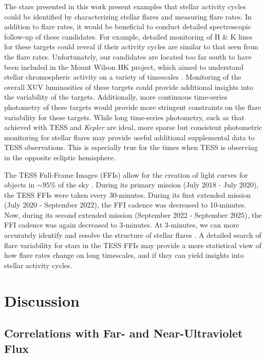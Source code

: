 \documentclass[twocolumn]{aastex631}
\begin{document}
The stars presented in this work present examples that stellar activity cycles could be identified by characterizing stellar flares and measuring flare rates. In addition to flare rates, it would
be beneficial to conduct detailed spectroscopic follow-up of these candidates. For example, detailed monitoring of  H \& K lines for these targets could reveal if their activity cycles
are similar to that seen from the flare rates. Unfortunately, our candidates are located too far south to have been included in the Mount Wilson HK project, which aimed to understand stellar
chromospheric activity on a variety of timescales \citep{Wilson68}. Monitoring of the overall XUV luminosities of these targets could provide additional insights into the variability of the targets.
Additionally, more continuous time-series photometry of these targets would provide more stringent constraints on the flare variability for these targets. While long time-series photometry,
such as that achieved with TESS and \textit{Kepler} are ideal, more sparse but consistent photometric monitoring for stellar flares may provide useful additional supplemental data to TESS observations.
This is especially true for the times when TESS is observing in the opposite ecliptic hemisphere.

The TESS Full-Frame Images (FFIs) allow for the creation of light curves for objects in $\sim 95\%$ of the sky \citep[e.g.][]{feinstein19}. During its primary mission (July 2018 - July 2020),
the TESS FFIs were taken every 30-minutes. During its first extended mission (July 2020 - September 2022), the FFI cadence was decreased to 10-minutes. Now, during its second extended mission
(September 2022 - September 2025), the FFI cadence was again decreased to 3-minutes. At 3-minutes, we can more accurately identify and  resolve the structure of stellar flares \citep{howard22}.
A detailed search of flare variability for stars in the TESS FFIs may provide a more statistical view of how flare rates change on long timescales, and if they can yield insights into stellar
activity cycles.


\section{Discussion}\label{sec:discuss}


\subsection{Correlations with Far- and Near-Ultraviolet Flux}
\end{document}
